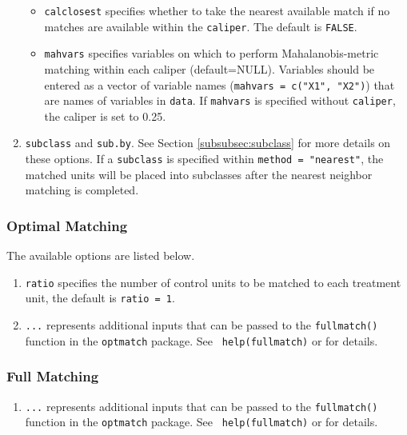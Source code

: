 \begin{enumerate}
\begin{itemize}
  \item \texttt{calclosest} specifies whether to take the nearest
    available match if no matches are available within the
    \texttt{caliper}. The default is {\tt FALSE}.
  \item \texttt{mahvars} specifies variables on which to perform
    Mahalanobis-metric matching within each caliper (default=NULL).
    Variables should be entered as a vector of variable names
    (\texttt{mahvars = c("X1", "X2")}) that are names of variables in
    \texttt{data}.  If \texttt{mahvars} is specified without
    \texttt{caliper}, the caliper is set to 0.25.
  \end{itemize}
\item \texttt{subclass} and \texttt{sub.by}.  See Section
  \ref{subsubsec:subclass} for more details on these options.  If a
  \texttt{subclass} is specified within \texttt{method = "nearest"},
  the matched units will be placed into subclasses after the nearest
  neighbor matching is completed.
\end{enumerate}

\subsubsection{Optimal Matching}
\label{subsubsec:inputs-optimal}

The available options are listed below.
\begin{enumerate}
\item {\tt ratio} specifies the number of control units to be matched
  to each treatment unit, the default is {\tt ratio = 1}.
\item {\tt ...} represents additional inputs that can be passed to the
  {\tt fullmatch()} function in the {\tt optmatch} package. See {\tt
    help(fullmatch)} or
  for details.
\end{enumerate}

\subsubsection{Full Matching}
\label{subsubsec:inputs-full}

\begin{enumerate}
\item {\tt ...} represents additional inputs that can be passed to the
  {\tt fullmatch()} function in the {\tt optmatch} package. See {\tt
    help(fullmatch)} or
  for details.
\end{enumerate}

